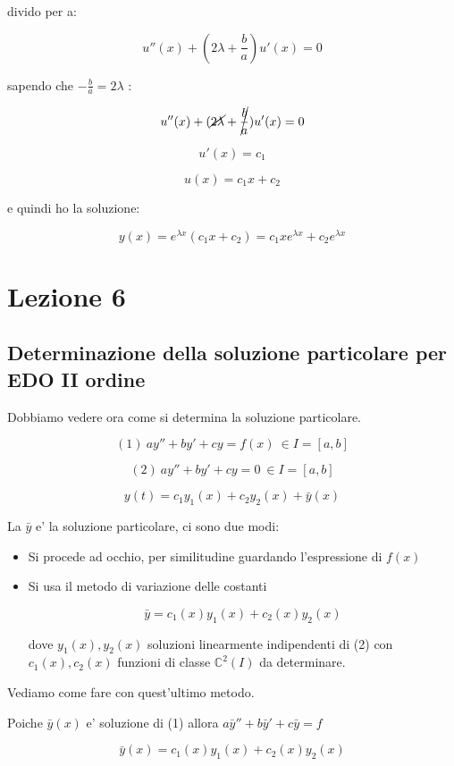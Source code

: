 \documentclass[11pt]{article}
\begin{document}
divido per a:

\[
 u''(x) + (2 \lambda + \frac{b}{a})u'(x) = 0
\]

sapendo che $-\frac{b}{a} = 2 \lambda$ :

\[
 u''(x) + (\cancel{2 \lambda} + \cancel{\frac{b}{a}})u'(x) = 0
\]


\[
    u'(x) = c_1
\]

\[
    u(x) = c_1 x +c_2
\]

e quindi ho la soluzione:

\[
    y(x) = e ^{\lambda x}(c_1x+c_2) = c_1x e^{\lambda x}+ c_2 e ^{\lambda x}
\]

\newpage

\section{Lezione 6}

\subsection{Determinazione della soluzione particolare per EDO II ordine}


Dobbiamo vedere ora come si determina la soluzione particolare.

\[
    (1)\ ay''+by'+cy = f(x)\ \in I=[a,b]
\]

\[
    (2)\ ay''+by'+cy = 0\ \in I=[a,b]
\]

\[
    y(t) = c_1 y_1(x) + c_2 y_2(x) + \bar{y} (x)
\]

La $\bar{y}$ e' la soluzione particolare, ci sono due modi:

\begin{itemize}
    \item Si procede ad occhio, per similitudine guardando l'espressione di $f(x)$
    \item Si usa il metodo di variazione delle costanti

        \[
            \bar{y} = c_1(x) y_1(x) + c_2(x) y_2(x)
        \]

        dove ${y_1(x),y_2(x)}$ soluzioni linearmente indipendenti di (2) con $c_1(x),c_2(x)$ funzioni di classe $\mathbb{C}^{2}(I)$ da determinare.
\end{itemize}

Vediamo come fare con quest'ultimo metodo.

Poiche $\bar{y} (x)$ e' soluzione di (1) allora  $a\bar{y} ''+b \bar{y}'+c\bar{y}=f$

\[
    \bar{y} (x) = c_1(x) y_1(x) + c_2(x) y_2(x)
\]
\end{document}
